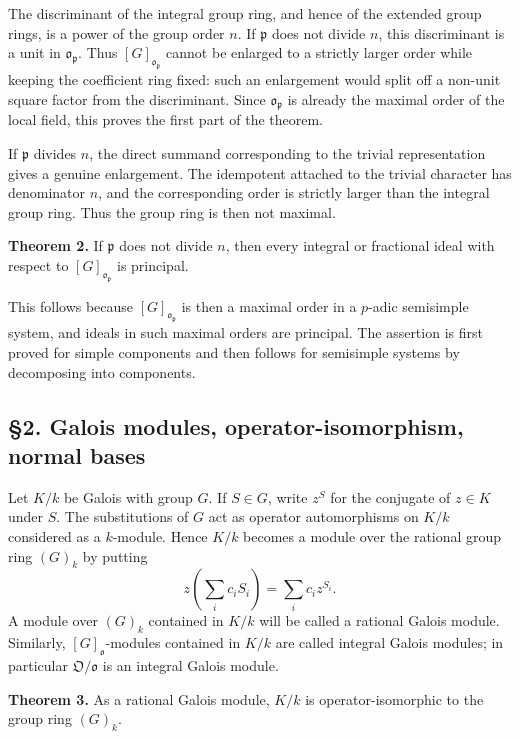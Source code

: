 \documentclass[
  11pt,
]{article}
\begin{document}
The discriminant of the integral group ring, and hence of the extended
group rings, is a power of the group order \(n\). If \(\mathfrak p\)
does not divide \(n\), this discriminant is a unit in
\(\mathfrak o_{\mathfrak p}\). Thus \([G]_{\mathfrak o_{\mathfrak p}}\)
cannot be enlarged to a strictly larger order while keeping the
coefficient ring fixed: such an enlargement would split off a non-unit
square factor from the discriminant. Since \(\mathfrak o_{\mathfrak p}\)
is already the maximal order of the local field, this proves the first
part of the theorem.

If \(\mathfrak p\) divides \(n\), the direct summand corresponding to
the trivial representation gives a genuine enlargement. The idempotent
attached to the trivial character has denominator \(n\), and the
corresponding order is strictly larger than the integral group ring.
Thus the group ring is then not maximal.

\textbf{Theorem 2.} If \(\mathfrak p\) does not divide \(n\), then every
integral or fractional ideal with respect to
\([G]_{\mathfrak o_{\mathfrak p}}\) is principal.

This follows because \([G]_{\mathfrak o_{\mathfrak p}}\) is then a
maximal order in a \(p\)-adic semisimple system, and ideals in such
maximal orders are principal. The assertion is first proved for simple
components and then follows for semisimple systems by decomposing into
components.

\subsection{§2. Galois modules, operator-isomorphism, normal
bases}\label{galois-modules-operator-isomorphism-normal-bases}

Let \(K/k\) be Galois with group \(G\). If \(S\in G\), write \(z^S\) for
the conjugate of \(z\in K\) under \(S\). The substitutions of \(G\) act
as operator automorphisms on \(K/k\) considered as a \(k\)-module. Hence
\(K/k\) becomes a module over the rational group ring \((G)_k\) by
putting \[
  z\left(\sum_i c_iS_i\right)=\sum_i c_i z^{S_i}.
\] A module over \((G)_k\) contained in \(K/k\) will be called a
rational Galois module. Similarly, \([G]_{\mathfrak o}\)-modules
contained in \(K/k\) are called integral Galois modules; in particular
\(\mathfrak O/\mathfrak o\) is an integral Galois module.

\textbf{Theorem 3.} As a rational Galois module, \(K/k\) is
operator-isomorphic to the group ring \((G)_k\).
\end{document}
